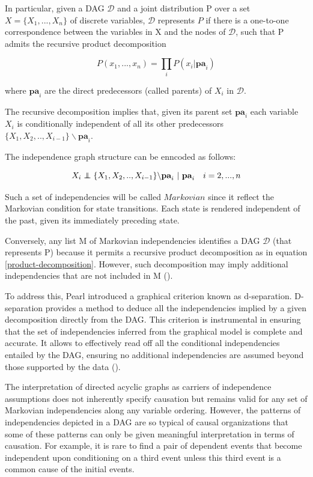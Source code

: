 \documentclass{report}
\newcommand\independent{\protect\mathpalette{\protect\independenT}{\perp}}
\def\independenT#1#2{\mathrel{\rlap{$#1#2$}\mkern2mu{#1#2}}}
\begin{document}
In particular, given a DAG $\mathcal{D}$ and a joint distribution P over a set $X = \{X_1, ..., X_n\}$ of discrete variables, $\mathcal{D}$ represents $P$ if there is a one-to-one correspondence between the variables in X and the nodes of $\mathcal{D}$, such that P admits the recursive product decomposition 

\begin{equation} \label{product-decomposition}
	P(x_1, ..., x_n) = \prod_i P(x_i | \textbf{pa}_i)
\end{equation}

where $\textbf{pa}_i$ are the direct predecessors (called parents) of $X_i$ in $\mathcal{D}$. 

The recursive decomposition implies that, given its parent set $\textbf{pa}_i$ each variable $X_i$ is conditionally independent of all its other predecessors $\{X_1,X_2,..,X_{i-1}\}\backslash \textbf{pa}_i$.

The independence graph structure can be enncoded as follows:

\begin{equation} \label{independence-structure}
	X_i \independent \{X_1,X_2,..,X_{i-1}\}\backslash \textbf{pa}_i \  | \  \textbf{pa}_i  \ \ \ i = 2, ..., n
\end{equation}

Such a set of independencies will be called $Markovian$ since it reflect the Markovian condition for state transitions. Each state is rendered independent of the past, given its immediately preceding state. 

Conversely, any list M of Markovian independencies identifies a DAG $\mathcal{D}$ (that represents P) because it permits a recursive product decomposition as in equation \ref{product-decomposition}.
However, such decomposition may imply additional independencies that are not included in M (\citet{pearl1995bayesian}). 

To address this, Pearl introduced a graphical criterion known as d-separation. D-separation provides a method to deduce all the independencies implied by a given decomposition directly from the DAG. This criterion is instrumental in ensuring that the set of independencies inferred from the graphical model is complete and accurate. It allows to effectively read off all the conditional independencies entailed by the DAG, ensuring no additional independencies are assumed beyond those supported by the data (\citet{pearl2016causal}). 

The interpretation of directed acyclic graphs as carriers of independence assumptions does not inherently specify causation but remains valid for any set of Markovian independencies along any variable ordering. However, the patterns of independencies depicted in a DAG are so typical of causal organizations that some of these patterns can only be given meaningful interpretation in terms of causation. For example, it is rare to find a pair of dependent events that become independent upon conditioning on a third event unless this third event is a common cause of the initial events.
\end{document}
